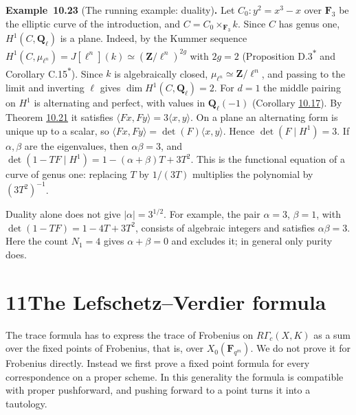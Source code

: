 \documentclass[11pt]{article}
\newenvironment{bpstatement}[2]{\par\addvspace{0.6\baselineskip}\noindent\textbf{#1}#2\textbf{.}\enspace\ignorespaces}
  {\par\addvspace{0.4\baselineskip}}
\newcommand{\bpout}[1]{#1\textsuperscript{\hyperlink{bp-outside}{\ensuremath{\ast}}}}
\begin{document}
\label{bp169}%
\begin{bpstatement}{Example~10.23}{ (The running example: duality)}
Let \(C_0\colon y^2=x^3-x\) over \(\mathbf F_3\) be the elliptic curve of the introduction, and \(C=C_0\times_{\mathbf F_3}k\). Since \(C\) has genus one, \(H^1(C,\mathbf Q_\ell)\) is a plane. Indeed, by the Kummer sequence \(H^1(C,\mu_{\ell^n})=J[\ell^n](k)\simeq(\mathbf Z/\ell^n)^{2g}\) with \(2g=2\) (Proposition \bpout{D.3} and Corollary \bpout{C.15}). Since \(k\) is algebraically closed, \(\mu_{\ell^n}\simeq\mathbf Z/\ell^n\), and passing to the limit and inverting \(\ell\) gives \(\dim H^1(C,\mathbf Q_\ell)=2\). For \(d=1\) the middle pairing on \(H^1\) is alternating and perfect, with values in \(\mathbf Q_\ell(-1)\) (Corollary \hyperref[bp152]{10.17}). By Theorem \hyperref[bp165]{10.21} it satisfies \(\langle Fx,Fy\rangle=3\langle x,y\rangle\). On a plane an alternating form is unique up to a scalar, so \(\langle Fx,Fy\rangle=\det(F)\langle
x,y\rangle\). Hence \(\det(F\mid H^1)=3\). If \(\alpha,\beta\) are the eigenvalues, then \(\alpha\beta=3\), and \(\det(1-TF\mid H^1)=1-(\alpha+\beta)T+3T^2\). This is the functional equation of a curve of genus one: replacing \(T\) by \(1/(3T)\) multiplies the polynomial by \((3T^2)^{-1}\).

Duality alone does not give \(|\alpha|=3^{1/2}\). For example, the pair \(\alpha=3\), \(\beta=1\), with \(\det(1-TF)=1-4T+3T^2\), consists of algebraic integers and satisfies \(\alpha\beta=3\). Here the count \(N_1=4\) gives \(\alpha+\beta=0\) and excludes it; in general only purity does.
\end{bpstatement}



\section*{\texorpdfstring{11\quad The Lefschetz–Verdier formula}{11 The Lefschetz–Verdier formula}}
\label{bp170}%
\label{bp171}%
The trace formula has to express the trace of Frobenius on \(R\Gamma_c(X,K)\) as a sum over the fixed points of Frobenius, that is, over \(X_0(\mathbf F_{q^m})\). We do not prove it for Frobenius directly. Instead we first prove a fixed point formula for every correspondence on a proper scheme. In this generality the formula is compatible with proper pushforward, and pushing forward to a point turns it into a tautology.
\end{document}
